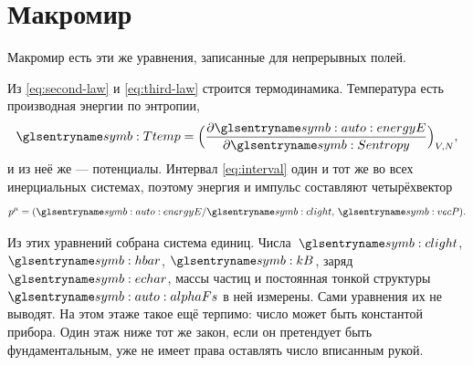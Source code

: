 \section{Макромир}
\label{sec:macro-known}

Макромир есть эти же уравнения, записанные для непрерывных полей.

Из \eqref{eq:second-law} и \eqref{eq:third-law} строится термодинамика.
Температура есть производная энергии по энтропии,
\begin{equation}
  \tempT = \Bigl(\frac{\partial \energyE}{\partial \entropyS}\Bigr)_{V,N},
  \label{eq:temperature}
\end{equation}
и из неё же --- потенциалы.
Интервал \eqref{eq:interval} один и тот же во всех инерциальных системах,
поэтому энергия и импульс составляют четырёхвектор
\begin{equation}
  p^{\mu} = (\energyE/\speedC,\,\vecP).
  \label{eq:four-momentum}
\end{equation}

Из этих уравнений собрана система единиц.
Числа~$\speedC$, $\planckHbar$, $\constBoltzmann$, заряд~$\chargeE$, массы частиц и постоянная тонкой структуры~$\alphaFs$ в ней измерены.
Сами уравнения их не выводят.
На этом этаже такое ещё терпимо: число может быть константой прибора.
Один этаж ниже тот же закон, если он претендует быть фундаментальным, уже не имеет права оставлять число вписанным рукой.

